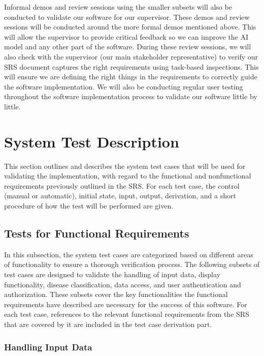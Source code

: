 \documentclass[12pt, titlepage]{article}
\begin{document}
Informal demos and review sessions using the smaller subsets will also be conducted to validate our software for our supervisor. These demos and review sessions will be conducted around the more formal demos mentioned above. This will allow the supervisor to provide critical feedback so we can improve the AI model and any other part of the software. During these review sessions, we will also check with the supervisor (our main stakeholder representative) to verify our SRS document captures the right requirements using task-based inspections. This will ensure we are defining the right things in the requirements to correctly guide the software implementation. We will also be conducting regular user testing throughout the software implementation process to validate our software little by little.


\section{System Test Description}
This section outlines and describes the system test cases that will be used for validating the implementation, with regard to the functional and nonfunctional requirements previously outlined in the SRS. For each test case, the control (manual or automatic), initial state, input, output, derivation, and a short procedure of how the test will be performed are given.

\subsection{Tests for Functional Requirements}
In this subsection, the system test cases are categorized based on different areas of functionality to ensure a thorough verification process. The following subsets of test cases are designed to validate the handling of input data, display functionality, disease classification, data access, and user authentication and authorization. These subsets cover the key functionalities the functional requirements have described are necessary for the success of this software. For each test case, references to the relevant functional requirements from the SRS that are covered by it are included in the test case derivation part.

\subsubsection{Handling Input Data}
\end{document}
